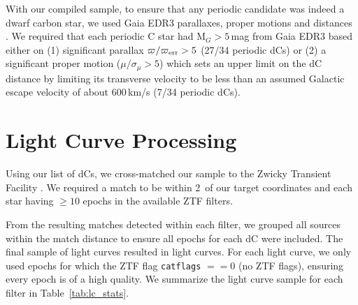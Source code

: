 \documentclass[twocolumn]{aastex631}
\begin{document}
With our compiled sample, to ensure that any periodic candidate was indeed a dwarf carbon star, we used Gaia EDR3 parallaxes, proper motions \citep{GaiaEDR3} and distances \citep{GaiaEDR3_dist}. We required that each periodic C star  had M$_G > 5$\,mag from Gaia EDR3 based either on (1) significant parallax $\varpi / \varpi_{\rm{err}} > 5$ (27/34 periodic dCs) or (2) a significant proper motion ($\mu/\sigma_\mu > 5$) which sets an upper limit on the dC distance by limiting its transverse velocity to be less than an assumed Galactic escape velocity \citep{Smith2007} of about 600\,km/s  (7/34 periodic dCs).

\section{Light Curve Processing} \label{sec:lc_processing}

Using our list of dCs, we cross-matched our sample to the Zwicky Transient Facility  \citep[ZTF;][]{ZTF_1,ZTF_2,ZTF_3}. We required a match to be within 2\arcsec\ of our target coordinates and each star having $\geq 10$ epochs in the available ZTF filters.

From the resulting matches detected within each filter, we grouped all sources within the match distance to ensure all epochs for each dC were included. The final sample of light curves resulted in  light curves. For each light curve, we only used epochs for which the ZTF flag \texttt{catflags} $ == 0$ (no ZTF flags), ensuring every epoch is of a high quality. We summarize the light curve sample for each filter in Table~\ref{tab:lc_stats}.
\end{document}
